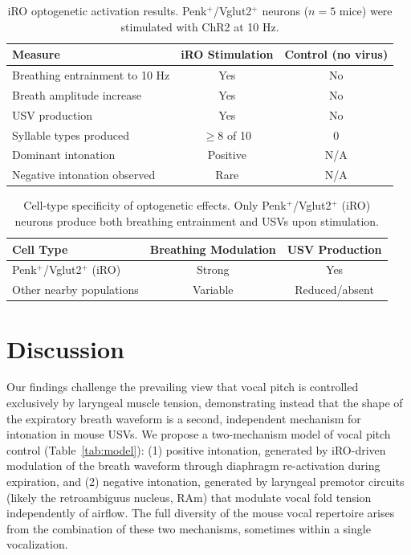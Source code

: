 \documentclass[11pt]{article}
\begin{document}
\begin{table}[H]
\centering
\caption{iRO optogenetic activation results. Penk$^+$/Vglut2$^+$ neurons ($n = 5$ mice) were stimulated with ChR2 at 10 Hz.}
\label{tab:opto}
\begin{tabular}{lcc}
\toprule
\textbf{Measure} & \textbf{iRO Stimulation} & \textbf{Control (no virus)} \\
\midrule
Breathing entrainment to 10 Hz & Yes & No \\
Breath amplitude increase & Yes & No \\
USV production & Yes & No \\
Syllable types produced & $\geq$8 of 10 & 0 \\
Dominant intonation & Positive & N/A \\
Negative intonation observed & Rare & N/A \\
\bottomrule
\end{tabular}
\end{table}

\begin{table}[H]
\centering
\caption{Cell-type specificity of optogenetic effects. Only Penk$^+$/Vglut2$^+$ (iRO) neurons produce both breathing entrainment and USVs upon stimulation.}
\label{tab:celltype}
\begin{tabular}{lcc}
\toprule
\textbf{Cell Type} & \textbf{Breathing Modulation} & \textbf{USV Production} \\
\midrule
Penk$^+$/Vglut2$^+$ (iRO) & Strong & Yes \\
Other nearby populations & Variable & Reduced/absent \\
\bottomrule
\end{tabular}
\end{table}

\section{Discussion}

Our findings challenge the prevailing view that vocal pitch is controlled exclusively by laryngeal muscle tension, demonstrating instead that the shape of the expiratory breath waveform is a second, independent mechanism for intonation in mouse USVs. We propose a two-mechanism model of vocal pitch control (Table~\ref{tab:model}): (1) positive intonation, generated by iRO-driven modulation of the breath waveform through diaphragm re-activation during expiration, and (2) negative intonation, generated by laryngeal premotor circuits (likely the retroambiguus nucleus, RAm) that modulate vocal fold tension independently of airflow. The full diversity of the mouse vocal repertoire arises from the combination of these two mechanisms, sometimes within a single vocalization.
\end{document}

